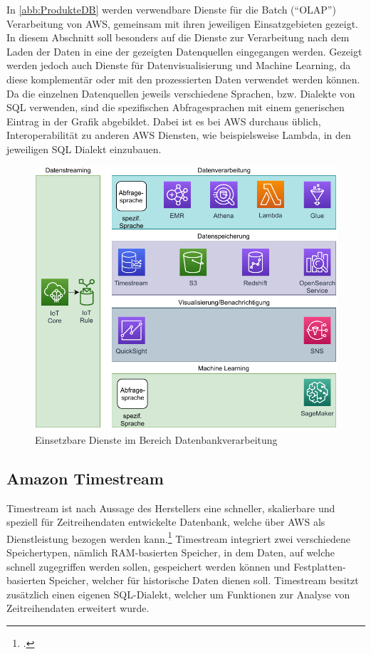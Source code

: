 In \autoref{abb:ProdukteDB} werden verwendbare Dienste für die Batch (\enquote{\ac{OLAP}}) Verarbeitung von \ac{AWS}, gemeinsam mit ihren jeweiligen Einsatzgebieten gezeigt. In diesem Abschnitt soll besonders auf die Dienste zur Verarbeitung nach dem Laden der Daten in eine der gezeigten Datenquellen eingegangen werden. Gezeigt werden jedoch auch Dienste für Datenvisualisierung und Machine Learning, da diese komplementär oder mit den prozessierten Daten verwendet werden können. Da die einzelnen Datenquellen jeweils verschiedene Sprachen, bzw. Dialekte von \ac{SQL} verwenden, sind die spezifischen Abfragesprachen mit einem generischen Eintrag in der Grafik abgebildet. Dabei ist es bei \ac{AWS} durchaus üblich, Interoperabilität zu anderen \ac{AWS} Diensten, wie beispielsweise Lambda, in den jeweiligen \ac{SQL} Dialekt einzubauen.

\begin{figure}[H]
\centering
\includegraphics[width=\textwidth]{graphics/Overview-DB.pdf}
\caption{Einsetzbare Dienste im Bereich Datenbankverarbeitung}
\label{abb:ProdukteDB}
\end{figure}

\subsection{Amazon Timestream}
Timestream ist nach Aussage des Herstellers eine schneller, skalierbare und speziell für Zeitreihendaten entwickelte Datenbank, welche über \ac{AWS} als Dienstleistung bezogen werden kann.\footcite[Vgl. auch im Folgenden][]{AmazonWebServicesInc..o.J.h} Timestream integriert zwei verschiedene Speichertypen, nämlich \ac{RAM}-basierten Speicher, in dem Daten, auf welche schnell zugegriffen werden sollen, gespeichert werden können und Festplatten-basierten Speicher, welcher für historische Daten dienen soll.
Timestream besitzt zusätzlich einen eigenen \ac{SQL}-Dialekt, welcher um Funktionen zur Analyse von Zeitreihendaten erweitert wurde. 


